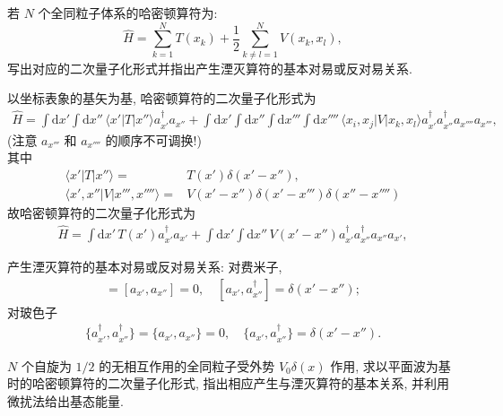 \documentclass{assignment}
\begin{document}
\begin{prob}
    若 $N$ 个全同粒子体系的哈密顿算符为:
    \[
        \hat{H}=\sum_{k=1}^NT(x_k)+\frac{1}{2}\sum_{k\neq l=1}^NV(x_k,x_l),
    \]
    写出对应的二次量子化形式并指出产生湮灭算符的基本对易或反对易关系.
\end{prob}
\begin{sol}
    以坐标表象的基矢为基, 哈密顿算符的二次量子化形式为
    \begin{align}
        \hat{H}=\int\mathrm{d}x'\int\mathrm{d}x''\,\langle x'\rvert T\lvert x''\rangle a_{x'}^{\dagger}a_{x''}+\int\mathrm{d}x'\int\mathrm{d}x''\int\mathrm{d}x'''\int\mathrm{d}x''''\,\langle x_i,x_j\rvert V\lvert x_k,x_l\rangle a_{x'}^{\dagger}a_{x''}^{\dagger}a_{x''''}a_{x'''},
    \end{align}
    (注意 $a_{x'''}$ 和 $a_{x''''}$ 的顺序不可调换!)\\
    其中
    \begin{align}
        \langle x'\rvert T\lvert x''\rangle=&T(x')\delta(x'-x''),\\
        \langle x',x''\rvert V\lvert x''',x''''\rangle=&V(x'-x'')\delta(x'-x''')\delta(x''-x'''')
    \end{align}
    故哈密顿算符的二次量子化形式为
    \begin{align}
        \hat{H}=\int\mathrm{d}x'\,T(x')a_{x'}^{\dagger}a_{x'}+\int\mathrm{d}x'\int\mathrm{d}x''\,V(x'-x'')a_{x'}^{\dagger}a_{x''}^{\dagger}a_{x''}a_{x'},
    \end{align}

    产生湮灭算符的基本对易或反对易关系: 对费米子,
    \begin{align}
        [a_{x'}^{\dagger},a_{x''}^{\dagger}]=[a_{x'},a_{x''}]=0,\quad[a_{x'},a_{x''}^{\dagger}]=\delta(x'-x'');
    \end{align}
    对玻色子
    \begin{align}
        \{a_{x'}^{\dagger},a_{x''}^{\dagger}\}=\{a_{x'},a_{x''}\}=0,\quad\{a_{x'},a_{x''}^{\dagger}\}=\delta(x'-x'').
    \end{align}
\end{sol}

\begin{prob}
    $N$ 个自旋为 $1/2$ 的无相互作用的全同粒子受外势 $V_0\delta(x)$ 作用, 求以平面波为基时的哈密顿算符的二次量子化形式, 指出相应产生与湮灭算符的基本关系, 并利用微扰法给出基态能量.
\end{prob}
\begin{sol}
    
\end{sol}
\end{document}
